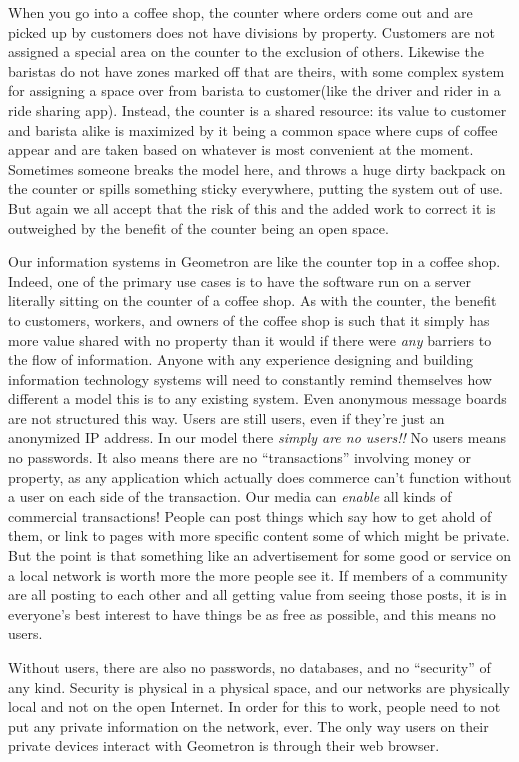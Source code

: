 When you go into a coffee shop, the counter where orders come out and are picked up by customers does not have divisions by property.  Customers are not assigned a special area on the counter to the exclusion of others.  Likewise the baristas do not have zones marked off that are theirs, with some complex system for assigning a space over from barista to customer(like the driver and rider in a ride sharing app).  Instead, the counter is a shared resource: its value to customer and barista alike is maximized by it being a common space where cups of coffee appear and are taken based on whatever is most convenient at the moment.  Sometimes someone breaks the model here, and throws a huge dirty backpack on the counter or spills something sticky everywhere, putting the system out of use.  But again we all accept that the risk of this and the added work to correct it is outweighed by the benefit of the counter being an open space.  

Our information systems in Geometron are like the counter top in a coffee shop.  Indeed, one of the primary use cases is to have the software run on a server literally sitting on the counter of a coffee shop.  As with the counter, the benefit to customers, workers, and owners of the coffee shop is such that it simply has more value shared with no property than it would if there were \emph{any} barriers to the flow of information.  Anyone with any experience designing and building information technology systems will need to constantly remind themselves how different a model this is to any existing system.  Even anonymous message boards are not structured this way.  Users are still users, even if they're just an anonymized IP address.  In our model there \emph{simply are no users!!}  No users means no passwords. It also means there are no ``transactions'' involving money or property, as any application which actually does commerce can't function without a user on each side of the transaction.  Our media can \emph{enable} all kinds of commercial transactions! People can post things which say how to get ahold of them, or link to pages with more specific content some of which might be private.  But the point is that something like an advertisement for some good or service on a local network is worth more the more people see it.  If members of a community are all posting to each other and all getting value from seeing those posts, it is in everyone's best interest to have things be as free as possible, and this means no users.

Without users, there are also no passwords, no databases, and no ``security'' of any kind.  Security is physical in a physical space, and our networks are physically local and not on the open Internet.  In order for this to work, people need to not put any private information on the network, ever.  The only way users on their private devices interact with Geometron is through their web browser.  

